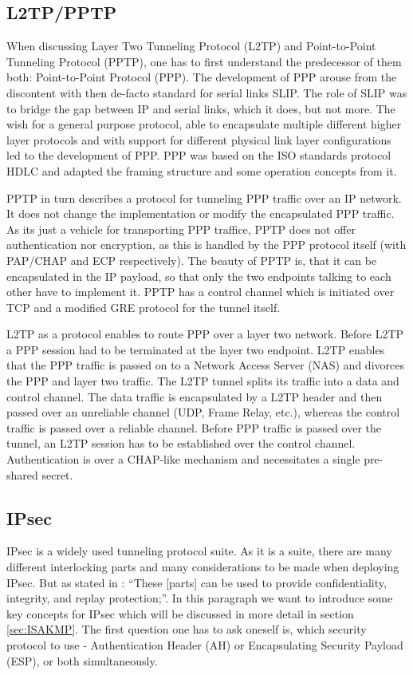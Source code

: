 \documentclass[a4paper]{report}
\begin{document}
\subsection{L2TP/PPTP}
\label{ssec:l2tppptp}
When discussing Layer Two Tunneling Protocol (L2TP) and Point-to-Point Tunneling Protocol (PPTP), one has to first understand the predecessor of them both: Point-to-Point Protocol (PPP).
The development of PPP arouse from the discontent with then de-facto standard for serial links SLIP. The role of SLIP was to bridge the gap between IP and serial links, which it does, but not more. The wish for a general purpose protocol, able to encapsulate multiple different higher layer protocols and with support for different physical link layer configurations led to the development of PPP. PPP was based on the ISO standards protocol HDLC and adapted the framing structure and some operation concepts from it.  \parencite{Kozierok2005}

PPTP in turn describes a protocol for tunneling PPP traffic over an IP network. It does not change the implementation or modify the encapsulated PPP traffic. As its just a vehicle for transporting PPP traffice, PPTP does not offer authentication nor encryption, as this is handled by the PPP protocol itself (with PAP/CHAP and ECP respectively). The beauty of PPTP is, that it can be encapsulated in the IP payload, so that only the two endpoints talking to each other have to implement it. PPTP has a control channel which is initiated over TCP and a modified GRE protocol for the tunnel itself. \parencite{Hamzeh1999}

L2TP as a protocol enables to route PPP over a layer two network. Before L2TP a PPP session had to be terminated at the layer two endpoint. L2TP enables that the PPP traffic is passed on to a Network Access Server (NAS) and divorces the PPP and layer two traffic. The L2TP tunnel splits its traffic into a data and control channel. The data traffic is encapsulated by a L2TP header and then passed over an unreliable channel (UDP, Frame Relay, etc.), whereas the control traffic is passed over a reliable channel. Before PPP traffic is passed over the tunnel, an L2TP session has to be established over the control channel. Authentication is over a CHAP-like mechanism and necessitates a single pre-shared secret. \parencite{Townsley1999}



\subsection{IPsec}
\label{ssec:IPsec}
IPsec is a widely used tunneling protocol suite. As it is a suite, there are many different interlocking parts and many considerations to be made when deploying IPsec. But as stated in \cite{Bellovin2009}: \textquotedblleft These [parts] can be used to provide confidentiality, integrity, and replay protection;\textquotedblright.
In this paragraph we want to introduce some key concepts for IPsec which will be discussed in more detail in section \ref{sec:ISAKMP}.
The first question one has to ask oneself is, which security protocol to use - Authentication Header (AH) or Encapsulating Security Payload (ESP), or both simultaneously. 
\end{document}
